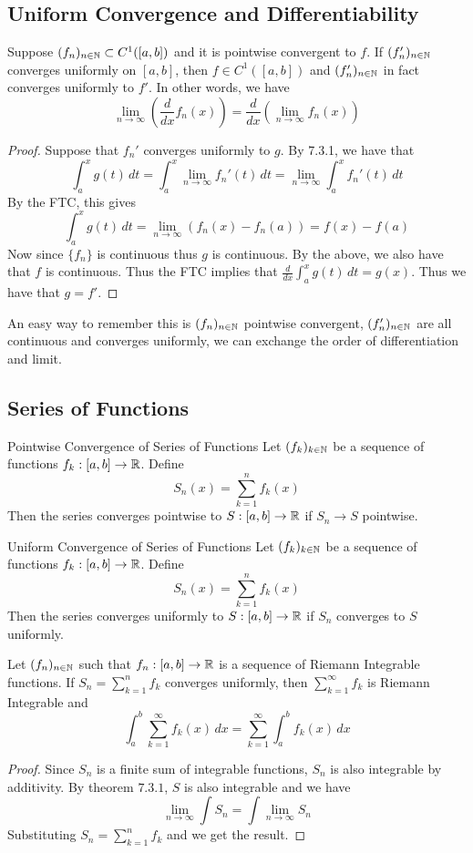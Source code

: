 \documentclass[a4paper]{article}
\begin{document}
\subsection{Uniform Convergence and Differentiability}
\begin{thm}{}{} Suppose $(f_n)_{n\in\mathbb{N}}\subset C^1([a,b])$ and it is pointwise convergent to $f$. If $(f_n')_{n\in\mathbb{N}}$ converges uniformly on $[a,b]$, then $f\in C^1([a,b])$ and $(f_n')_{n\in\mathbb{N}}$ in fact converges uniformly to $f'$. In other words, we have $$\lim_{n\to\infty}\left(\frac{d}{dx}f_n(x)\right)=\frac{d}{dx}\left(\lim_{n\to\infty}f_n(x)\right)$$ \tcbline
\begin{proof} Suppose that $f_n'$ converges uniformly to $g$. By 7.3.1, we have that $$\int_a^xg(t)\,dt=\int_a^x\lim_{n\to\infty}f_n'(t)\,dt=\lim_{n\to\infty}\int_a^xf_n'(t)\,dt$$
By the FTC, this gives $$\int_a^xg(t)\,dt=\lim_{n\to\infty}(f_n(x)-f_n(a))=f(x)-f(a)$$
Now since $\{f_n\}$ is continuous thus $g$ is continuous. By the above, we also have that $f$ is continuous. Thus the FTC implies that $\frac{d}{dx}\int_a^xg(t)\,dt=g(x)$. Thus we have that $g=f'$. 
\end{proof}
\end{thm}

An easy way to remember this is $(f_n)_{n\in\mathbb{N}}$ pointwise convergent, $(f_n')_{n\in\mathbb{N}}$ are all continuous and converges uniformly, we can exchange the order of differentiation and limit. 

\subsection{Series of Functions}
\begin{defn}{Pointwise Convergence of Series of Functions}{} Let $(f_k)_{k\in\mathbb{N}}$ be a sequence of functions $f_k:[a,b]\to\mathbb{R}$. Define $$S_n(x)=\sum_{k=1}^nf_k(x)$$ Then the series converges pointwise to $S:[a,b]\to\mathbb{R}$ if $S_n\to S$ pointwise. 
\end{defn}

\begin{defn}{Uniform Convergence of Series of Functions}{} Let $(f_k)_{k\in\mathbb{N}}$ be a sequence of functions $f_k:[a,b]\to\mathbb{R}$. Define $$S_n(x)=\sum_{k=1}^nf_k(x)$$ Then the series converges uniformly to $S:[a,b]\to\mathbb{R}$ if $S_n$ converges to $S$ uniformly.  
\end{defn}

\begin{thm}{}{} Let $(f_n)_{n\in\mathbb{N}}$ such that $f_n:[a,b]\to\mathbb{R}$ is a sequence of Riemann Integrable functions. If $S_n=\sum_{k=1}^nf_k$ converges uniformly, then $\sum_{k=1}^\infty f_k$ is Riemann Integrable and $$\int_a^b\sum_{k=1}^\infty f_k(x)\,dx=\sum_{k=1}^\infty\int_a^bf_k(x)\,dx$$ \tcbline
\begin{proof} Since $S_n$ is a finite sum of integrable functions, $S_n$ is also integrable by additivity. By theorem $7.3.1$, $S$ is also integrable and we have $$\lim_{n\to\infty}\int S_n=\int\lim_{n\to\infty}S_n$$ Substituting $S_n=\sum_{k=1}^nf_k$ and we get the result. 
\end{proof}
\end{thm}
\end{document}
